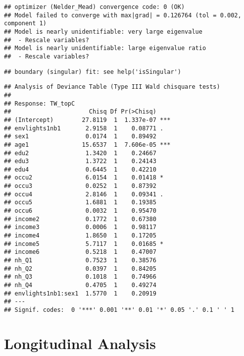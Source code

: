 \documentclass[
]{book}
\begin{document}
\begin{verbatim}
## optimizer (Nelder_Mead) convergence code: 0 (OK)
## Model failed to converge with max|grad| = 0.126764 (tol = 0.002, component 1)
## Model is nearly unidentifiable: very large eigenvalue
##  - Rescale variables?
## Model is nearly unidentifiable: large eigenvalue ratio
##  - Rescale variables?
\end{verbatim}

\begin{verbatim}
## boundary (singular) fit: see help('isSingular')
\end{verbatim}

\begin{verbatim}
## Analysis of Deviance Table (Type III Wald chisquare tests)
## 
## Response: TW_topC
##                      Chisq Df Pr(>Chisq)    
## (Intercept)        27.8119  1  1.337e-07 ***
## envlights1nb1       2.9158  1    0.08771 .  
## sex1                0.0174  1    0.89492    
## age1               15.6537  1  7.606e-05 ***
## edu2                1.3420  1    0.24667    
## edu3                1.3722  1    0.24143    
## edu4                0.6445  1    0.42210    
## occu2               6.0154  1    0.01418 *  
## occu3               0.0252  1    0.87392    
## occu4               2.8146  1    0.09341 .  
## occu5               1.6881  1    0.19385    
## occu6               0.0032  1    0.95470    
## income2             0.1772  1    0.67380    
## income3             0.0006  1    0.98117    
## income4             1.8650  1    0.17205    
## income5             5.7117  1    0.01685 *  
## income6             0.5218  1    0.47007    
## nh_Q1               0.7523  1    0.38576    
## nh_Q2               0.0397  1    0.84205    
## nh_Q3               0.1018  1    0.74966    
## nh_Q4               0.4705  1    0.49274    
## envlights1nb1:sex1  1.5770  1    0.20919    
## ---
## Signif. codes:  0 '***' 0.001 '**' 0.01 '*' 0.05 '.' 0.1 ' ' 1
\end{verbatim}

\hypertarget{longitudinal-analysis}{%
\chapter{Longitudinal Analysis}\label{longitudinal-analysis}}

  
\end{document}
